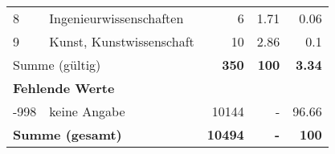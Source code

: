 \begin{longtable}{lXrrr}
     8 &
     \multicolumn{1}{X}{ Ingenieurwissenschaften   } &


       \num{6} &
       \num[round-mode=places,round-precision=2]{1.71} &
         \num[round-mode=places,round-precision=2]{0.06} \\

     9 &
     \multicolumn{1}{X}{ Kunst, Kunstwissenschaft   } &


       \num{10} &
       \num[round-mode=places,round-precision=2]{2.86} &
         \num[round-mode=places,round-precision=2]{0.1} \\
     \midrule
     \multicolumn{2}{l}{Summe (gültig)} &
       \textbf{\num{350}} &
     \textbf{\num{100}} &
       \textbf{\num[round-mode=places,round-precision=2]{3.34}} \\
     \multicolumn{5}{l}{\textbf{Fehlende Werte}}\\
       -998 &
       keine Angabe &
         \num{10144} &
        - &
         \num[round-mode=places,round-precision=2]{96.66} \\
     \midrule
     \multicolumn{2}{l}{\textbf{Summe (gesamt)}} &
          \textbf{\num{10494}} &
        \textbf{-} &
        \textbf{\num{100}} \\
     \bottomrule
     \end{longtable}
     
